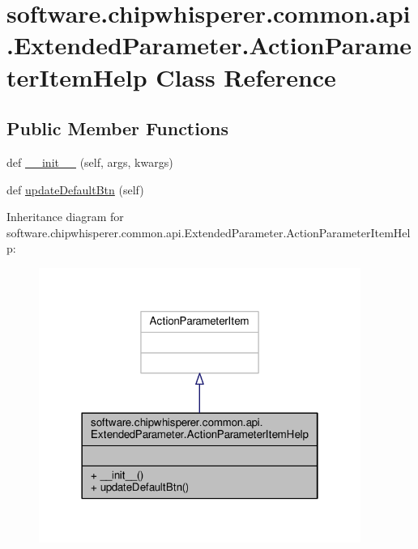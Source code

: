 \hypertarget{classsoftware_1_1chipwhisperer_1_1common_1_1api_1_1ExtendedParameter_1_1ActionParameterItemHelp}{}\section{software.\+chipwhisperer.\+common.\+api.\+Extended\+Parameter.\+Action\+Parameter\+Item\+Help Class Reference}
\label{classsoftware_1_1chipwhisperer_1_1common_1_1api_1_1ExtendedParameter_1_1ActionParameterItemHelp}
\subsection*{Public Member Functions}
\begin{DoxyCompactItemize}
\item 
def \hyperlink{classsoftware_1_1chipwhisperer_1_1common_1_1api_1_1ExtendedParameter_1_1ActionParameterItemHelp_a42df8e71bdb9c7c9e26b3af60ed484d7}{\+\_\+\+\_\+init\+\_\+\+\_\+} (self, args, kwargs)
\item 
def \hyperlink{classsoftware_1_1chipwhisperer_1_1common_1_1api_1_1ExtendedParameter_1_1ActionParameterItemHelp_ada2a063abf42189a201886d49d2b6e35}{update\+Default\+Btn} (self)
\end{DoxyCompactItemize}


Inheritance diagram for software.\+chipwhisperer.\+common.\+api.\+Extended\+Parameter.\+Action\+Parameter\+Item\+Help\+:\nopagebreak
\begin{figure}[H]
\begin{center}
\leavevmode
\includegraphics[width=298pt]{d1/dd1/classsoftware_1_1chipwhisperer_1_1common_1_1api_1_1ExtendedParameter_1_1ActionParameterItemHelp__inherit__graph}
\end{center}
\end{figure}


